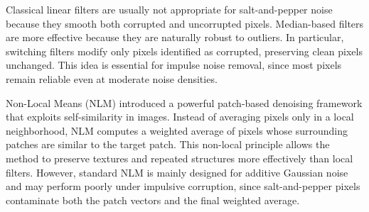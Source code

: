 \documentclass{ieeeaccess}
\begin{document}
Classical linear filters are usually not appropriate for salt-and-pepper noise because they smooth both corrupted and uncorrupted pixels. Median-based filters are more effective because they are naturally robust to outliers. In particular, switching filters modify only pixels identified as corrupted, preserving clean pixels unchanged. This idea is essential for impulse noise removal, since most pixels remain reliable even at moderate noise densities.

Non-Local Means (NLM) introduced a powerful patch-based denoising framework that exploits self-similarity in images. Instead of averaging pixels only in a local neighborhood, NLM computes a weighted average of pixels whose surrounding patches are similar to the target patch. This non-local principle allows the method to preserve textures and repeated structures more effectively than local filters. However, standard NLM is mainly designed for additive Gaussian noise and may perform poorly under impulsive corruption, since salt-and-pepper pixels contaminate both the patch vectors and the final weighted average.
\end{document}
